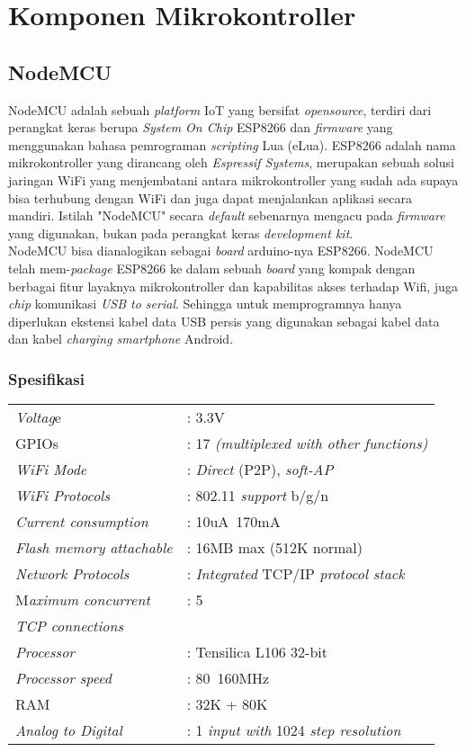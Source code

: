 \section{Komponen Mikrokontroller}

\subsection{NodeMCU}
\tab NodeMCU adalah sebuah \textit{platform} IoT yang bersifat \textit{opensource}, terdiri dari perangkat keras berupa \textit{System On Chip} ESP8266 dan \textit{firmware} yang menggunakan bahasa pemrograman \textit{scripting} Lua (eLua). ESP8266 adalah nama mikrokontroller yang dirancang oleh \textit{Espressif Systems}, merupakan sebuah solusi jaringan WiFi yang menjembatani antara mikrokontroller yang sudah ada supaya bisa terhubung dengan WiFi dan juga dapat menjalankan aplikasi secara mandiri. Istilah "NodeMCU" secara \textit{default} sebenarnya mengacu pada \textit{firmware} yang digunakan, bukan pada perangkat keras \textit{development kit}.\\
\tab NodeMCU bisa dianalogikan sebagai \textit{board} arduino-nya ESP8266. NodeMCU telah mem-\textit{package} ESP8266 ke dalam sebuah \textit{board} yang kompak dengan berbagai fitur layaknya mikrokontroller dan kapabilitas akses terhadap Wifi, juga \textit{chip} komunikasi \textit{USB to serial}. Sehingga untuk memprogramnya hanya diperlukan ekstensi kabel data USB persis yang digunakan sebagai kabel data dan kabel \textit{charging smartphone} Android.

\subsubsection{Spesifikasi}
\begin{tabular}{ll}
	\tab \textit{Voltag}e &: 3.3V\\
	\tab GPIOs &: 17 \textit{(multiplexed with other functions)}\\
	\tab\textit{WiFi Mode} &: \textit{Direct} (P2P), \textit{soft-AP}\\
	\tab \textit{WiFi Protocols} &: 802.11 \textit{support} b/g/n\\
	\tab \textit{Current consumption} &: 10uA~170mA\\
	\tab \textit{Flash memory attachable} &: 16MB max (512K normal)\\
	\tab \textit{Network Protocols} &: \textit{Integrated} TCP/IP \textit{protocol stack}\\
	\tab M\textit{aximum concurrent}  &: 5\\
	\tab \textit{TCP connections}\\
	\tab \textit{Processor} &: Tensilica L106 32-bit\\
	\tab \textit{Processor speed }&: 80~160MHz\\
	\tab RAM &: 32K + 80K\\
	\tab \textit{Analog to Digital} &: 1 \textit{input with} 1024 \textit{step resolution}\\
\end{tabular}
	
